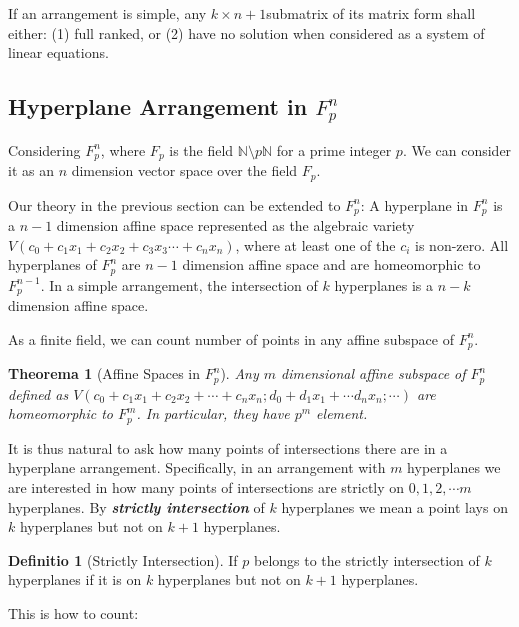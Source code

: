 \documentclass[12pt, a4paper]{article}
\newtheorem{theorem}{Theorema}[subsection]
\theoremstyle{definition}
\newtheorem{definition}{Definitio}[section]
\theoremstyle{remark}
\newcommand{\bb}[1]{\mathbb{#1}}
\renewcommand{\emph}[1]{\textit{\textbf{#1}}}
\begin{document}
If an arrangement is simple, any $k \times n+1 $submatrix of its matrix form shall either:  (1) full ranked, or (2) have no solution when considered as a system of linear equations.

\subsection{Hyperplane Arrangement in $F_p^n$}

Considering $F_p^n$, where $F_p$ is the field $\mathbb{N} \setminus p \bb{N}$ for a prime integer $p$. 
We can consider it as an $n$ dimension vector space over the field $F_p$. 

Our theory in the previous section can be extended to $F_p^n$:
A hyperplane in $F_p^n$ is a $n-1$ dimension affine space represented as the algebraic variety $V(c_0 + c_1x_1 + c_2x_2 + c_3x_3 \cdots + c_nx_n)$, where at least one of the $c_i$ is non-zero. All hyperplanes of $F_p^n$ are $n-1$ dimension affine space and are homeomorphic to $F_p^{n-1}$. In a simple arrangement, the intersection of $k$ hyperplanes is a $n-k$ dimension affine space.

As a finite field, we can count number of points in any affine subspace of $F_p^n$. 

\begin{theorem}[Affine Spaces in $F_p^n$]
	Any $m$ dimensional affine subspace of $F_p^n$ defined as $V(c_0 + c_1x_1+c_2x_2 + \cdots + c_nx_n; d_0 + d_1x_1 + \cdots d_nx_n; \cdots)$ are homeomorphic to $F_p^m$. In particular, they have $p^m$ element.
\end{theorem}

It is thus natural to ask how many points of intersections there are in a hyperplane arrangement. 
Specifically, in an arrangement with $m$ hyperplanes we are interested in how many points of intersections are strictly on $0, 1, 2, \cdots m$ hyperplanes. 
By \emph{strictly intersection} of $k$ hyperplanes we mean a point lays on $k$ hyperplanes but not on $k+1$ hyperplanes. 

\begin{definition}[Strictly Intersection]
	If $p$ belongs to the strictly intersection of $k$ hyperplanes if it is on $k$ hyperplanes but not on $k+1$ hyperplanes.
\end{definition}

This is how to count:
\end{document}

